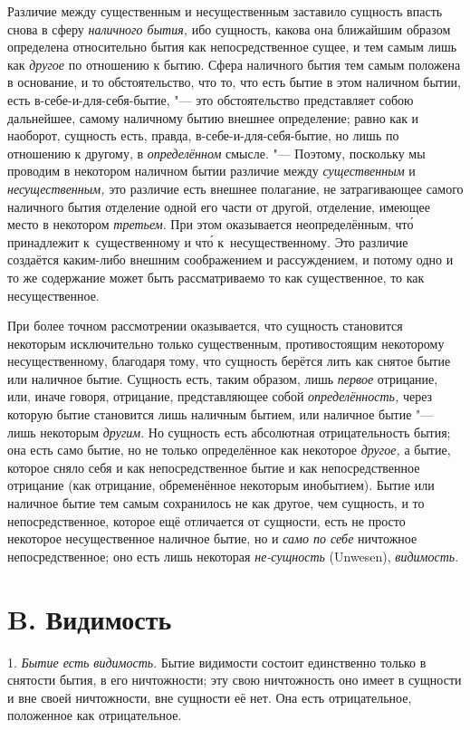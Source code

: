 Различие между существенным и несущественным заставило сущность впасть снова
в сферу {\em наличного бытия,} ибо сущность, какова она
ближайшим образом определена относительно бытия как непосредственное сущее,
и тем самым лишь как {\em другое} по отношению к бытию.
Сфера наличного бытия тем самым положена в основание, и то обстоятельство,
что то, что есть бытие в этом наличном бытии, есть в-себе-и-для-себя-бытие,
"--- это обстоятельство представляет собою дальнейшее, самому наличному бытию
внешнее определение; равно как и наоборот, сущность есть, правда,
в-себе-и-для-себя-бытие, но лишь по отношению к другому, в
{\em определённом} смысле. "--- Поэтому, поскольку мы
проводим в некотором наличном бытии различие между
{\em существенным} и
{\em несущественным,} это различие есть внешнее
полагание, не затрагивающее самого наличного бытия отделение одной его
части от другой, отделение, имеющее место в некотором
{\em третьем}. При этом оказывается неопределённым, чт\'{о} принадлежит
к~существенному и чт\'{о} к~несущественному. Это различие создаётся
каким-либо внешним соображением и рассуждением, и потому одно и то же
содержание может быть рассматриваемо то как существенное, то как
несущественное.

При более точном рассмотрении оказывается, что сущность становится некоторым
исключительно только существенным, противостоящим некоторому
несущественному, благодаря тому, что сущность берётся лить как снятое бытие
или наличное бытие. Сущность есть, таким образом, лишь
{\em первое} отрицание, или, иначе говоря, отрицание,
представляющее собой {\em определённость,} через
которую бытие становится лишь наличным бытием, или наличное бытие "--- лишь
некоторым {\em другим}. Но сущность есть абсолютная
отрицательность бытия; она есть само бытие, но не только определённое как
некоторое {\em другое,} а бытие, которое сняло себя и
как непосредственное бытие и как непосредственное отрицание (как отрицание,
обременённое некоторым инобытием). Бытие или наличное бытие тем самым
сохранилось не как другое, чем сущность, и то непосредственное, которое ещё
отличается от сущности, есть не просто некоторое несущественное наличное
бытие, но и {\em само по себе} ничтожное
непосредственное; оно есть лишь некоторая
{\em не-сущность} (Unwesen),
{\em видимость}.

\section[B. Видимость]{B. Видимость}
1. {\em Бытие есть
видимость}. Бытие видимости состоит единственно только в снятости бытия, в
его ничтожности; эту свою ничтожность оно имеет в сущности и вне своей
ничтожности, вне сущности её нет. Она есть отрицательное, положенное как
отрицательное.

